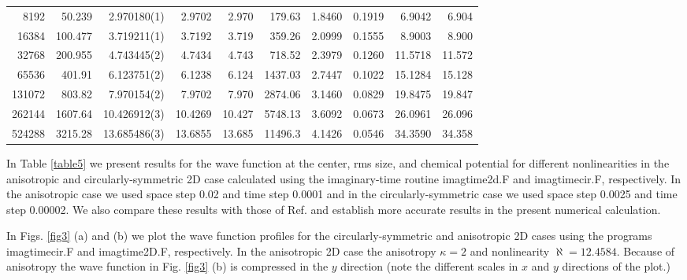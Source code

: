 \documentclass[onecolumn]{elsart3p}
\begin{document}
\begin{table}[!ht]
\begin{center}
\begin{tabular}{|r|r|r|r|r|r|r|r|r|r|}
    8192 &   50.239  &  2.970180(1)  & 2.9702 &2.970  &
179.63&1.8460
&0.1919
&6.9042
&6.904 \\
   16384 &    100.477 & 3.719211(1)  & 3.7192 &3.719  &
359.26
&2.0999
&0.1555 &8.9003
&8.900\\
   32768 &   200.955 & 4.743445(2)  & 4.7434 &4.743  &
718.52&
2.3979
&0.1260 &11.5718
&11.572\\
   65536 &   401.91 &6.123751(2)  & 6.1238 &6.124  &
1437.03&2.7447
&0.1022
&  15.1284
&15.128
\\
  131072 &   803.82 & 7.970154(2)  & 7.9702 &7.970  &
2874.06 &  3.1460
&0.0829 & 19.8475& 19.847
\\
  262144 &  1607.64 & 10.426912(3)     & 10.4269  & 10.427  &
5748.13 &
3.6092&
0.0673&
26.0961&26.096
\\
  524288 &  3215.28 & 13.685486(3)  &13.6855 &13.685  &
11496.3
&4.1426
&0.0546 & 34.3590 &
34.358
\\
\hline
\end{tabular}
\end{center}
\end{table}



In Table \ref{table5} we present results for the wave function at the
center, rms size, and chemical potential for different nonlinearities
in the anisotropic  and circularly-symmetric 2D case calculated using
the imaginary-time routine
imagtime2d.F and imagtimecir.F,  respectively.  In the anisotropic
case we used
 space step 0.02 and time step 0.0001 and in the circularly-symmetric
case we used  space step 0.0025 and time step 0.00002. We also compare
these
results with those of Ref. \cite{Bao_Tang} and establish more accurate
results in the present numerical calculation.


In  Figs. \ref{fig3} (a) and (b) we plot the wave function profiles for
the circularly-symmetric and  anisotropic 2D  cases using the programs
imagtimecir.F
 and
imagtime2D.F, respectively.
In the anisotropic 2D case the anisotropy $\kappa =2$ and nonlinearity
$\aleph %
=12.4584$. Because of anisotropy the wave function in 
Fig. \ref{fig3}
(b)
is compressed in
the $y$ direction (note the different scales in $x$ and $y$ directions
of the plot.)
\end{document}
